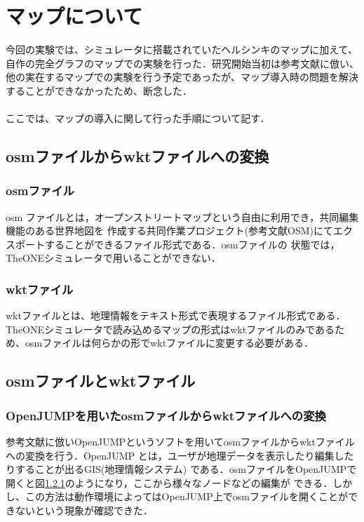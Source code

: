 \documentclass[11pt]{icsthesis}
\begin{document}
\chapter{マップについて}
今回の実験では、シミュレータに搭載されていたヘルシンキのマップに加えて、自作の完全グラフのマップでの実験を行った．研究開始当初は参考文献に倣い、他の実在するマップでの実験を行う予定であったが、マップ導入時の問題を解決することができなかったため、断念した．\\\\
ここでは、マップの導入に関して行った手順について記す．

\section{osmファイルからwktファイルへの変換}



\subsection{osmファイル}
osm ファイルとは，オープンストリートマップという自由に利用でき，共同編集機能のある世界地図を
作成する共同作業プロジェクト(参考文献OSM)にてエクスポートすることができるファイル形式である．osmファイルの
状態では，TheONEシミュレータで用いることができない．
\subsection{wktファイル}
wktファイルとは、地理情報をテキスト形式で表現するファイル形式である．TheONEシミュレータで読み込めるマップの形式はwktファイルのみであるため、osmファイルは何らかの形でwktファイルに変更する必要がある．
\section{osmファイルとwktファイル}

\subsection{OpenJUMPを用いたosmファイルからwktファイルへの変換}
参考文献に倣いOpenJUMPというソフトを用いてosmファイルからwktファイルへの変換を行う．OpenJUMP とは，ユーザが地理データを表示したり編集したりすることが出るGIS(地理情報システム)
である．osmファイルをOpenJUMPで開くと図\ref{}のようになり，ここから様々なノードなどの編集が
できる．しかし、この方法は動作環境によってはOpenJUMP上でosmファイルを開くことができないという現象が確認できた．
\end{document}
